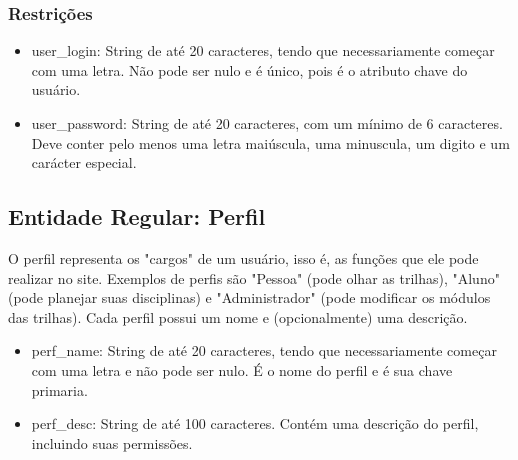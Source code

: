\documentclass{article}
\begin{document}
  	    \subsubsection{Restrições}
  	        \begin{itemize}
  	            \item user\_login: String de até 20 caracteres, tendo que necessariamente começar com uma letra. Não pode ser nulo e é único, pois é o atributo chave do usuário.
  	            \item user\_password: String de até 20 caracteres, com um mínimo de 6 caracteres. Deve conter pelo menos uma letra maiúscula, uma minuscula, um digito e um carácter especial.
  	        \end{itemize}
  	        
  	\subsection{Entidade Regular: Perfil}
  	    \quad O perfil representa os "cargos" de um usuário, isso é, as funções que ele pode realizar no site. Exemplos de perfis são "Pessoa" (pode olhar as trilhas), "Aluno" (pode planejar suas disciplinas) e "Administrador" (pode modificar os módulos das trilhas).
  	    \quad Cada perfil possui um nome e (opcionalmente) uma descrição.
  	    \begin{itemize}
  	            \item perf\_name: String de até 20 caracteres, tendo que necessariamente começar com uma letra e não pode ser nulo. É o nome do perfil e é sua chave primaria. 
  	            \item perf\_desc: String de até 100 caracteres. Contém uma descrição do perfil, incluindo suas permissões.
  	    \end{itemize}
  	
\end{document}
